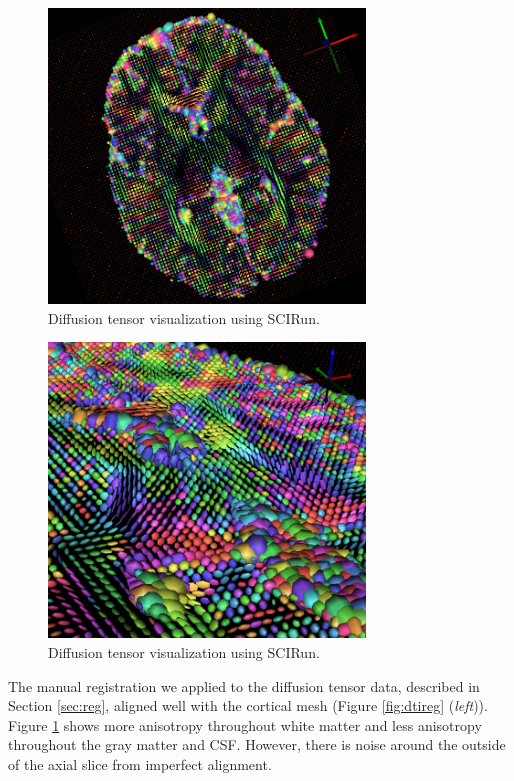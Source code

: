 \begin{figure}[H]
\begin{center}
\includegraphics[width=0.75\textwidth]{Figures/DTI_1.png}
\caption{Diffusion tensor visualization using SCIRun.}
\label{fig:tensorvis}
\end{center}
\end{figure}

\begin{figure}[H]
\begin{center}
\includegraphics[width=0.75\textwidth]{Figures/DTI_2.png}
\caption{Diffusion tensor visualization using SCIRun.}
\label{fig:tensorvis2}
\end{center}
\end{figure}

The manual registration we applied to the diffusion tensor data, described in Section \ref{sec:reg}, aligned well with the cortical mesh (Figure \ref{fig:dtireg} (\textit{left})). Figure \ref{fig:tensorvis} shows more anisotropy throughout white matter and less anisotropy throughout the gray matter and CSF. However, there is noise around the outside of the axial slice from imperfect alignment.  
 
